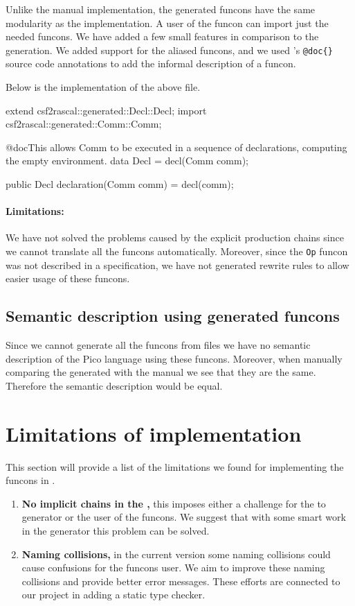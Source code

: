 \documentclass[a4paper, oneside, notitlepage]{article}
\newcommand{\CSF}{\textsmaller{CSF}\xspace}
\newcommand{\ASFSDF}{\textsmaller{ASF\hspace{-.05em}\raisebox{.4ex}{\tiny\bf +}SDF}\xspace}
\newcommand{\ADT}{\textsmaller{ADT}\xspace}
\newcommand{\ADTs}{\textsmaller{ADTs}\xspace}
\newcommand{\code}[1]{\texttt{#1}\xspace}
\begin{document}
	Unlike the manual implementation, the generated funcons have the same
	modularity as the \ASFSDF implementation.
	A user of the funcon can import just the needed funcons.
	We have added a few small features in comparison to the \ASFSDF generation.
	We added support for the aliased funcons, and we used \Rascal's
	\code{@doc\{\}} source code annotations to add the informal description of a
	funcon.

	Below is the \Rascal implementation of the above \CSF file.

\begin{rascal}
extend csf2rascal::generated::Decl::Decl;
import csf2rascal::generated::Comm::Comm;
 
@doc{This allows Comm to be executed in a sequence of declarations, computing the
 empty environment.}
data Decl = decl(Comm comm);

public Decl declaration(Comm comm) = 
	decl(comm);
\end{rascal}
	
	\paragraph{Limitations:}
	We have not solved the problems caused by the explicit production chains
	since we cannot translate all the funcons automatically.
	Moreover, since the \code{Op} funcon was not described in a \CSF
	specification, we have not generated rewrite rules to allow easier usage of
	these funcons.

	\subsection{Semantic description using generated funcons}
	Since we cannot generate all the funcons from \CSF files we have no semantic
	description of the Pico language using these funcons.
	Moreover, when manually comparing the generated \ADT with the manual \ADT we
	see that they are the same.
	Therefore the semantic description would be equal.

\section{Limitations of \Rascal implementation}
This section will provide a list of the limitations we found for implementing
the funcons in \Rascal.

\begin{enumerate}
	\newcommand{\limit}[2]{\item \textbf{#1,} #2}
	\limit
		{No implicit chains in the \ADTs}
		{
			this imposes either a challenge for the \CSF to \Rascal generator or
			the user of the funcons.
			We suggest that with some smart work in the \Rascal generator this
			problem can be solved.
		}

	\limit
		{Naming collisions}
		{
			in the current version some naming collisions could cause confusions
			for the funcons user.
			We aim to improve these naming collisions and provide better error
			messages.
			These efforts are connected to our project in adding a static type
			checker.
		}
	
\end{enumerate}
\end{document}
